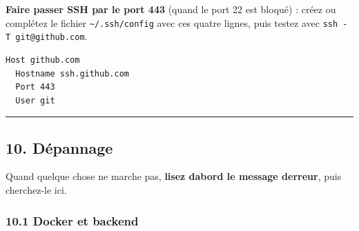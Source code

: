 \documentclass[
  french,
  11pt,
  a4paper,
]{article}
\begin{document}
\textbf{Faire passer SSH par le port 443} (quand le port 22 est bloqué)
: créez ou complétez le fichier \texttt{\textasciitilde{}/.ssh/config}
avec ces quatre lignes, puis testez avec
\texttt{ssh\ -\allowbreak{}T\ git@github.\allowbreak{}com}.

\begin{Verbatim}[breaklines=true,breakanywhere=true,fontsize=\small,frame=leftline,framerule=1.6pt,rulecolor=\color{credixblue},framesep=3mm,xleftmargin=2mm,xrightmargin=1mm]
Host github.com
  Hostname ssh.github.com
  Port 443
  User git
\end{Verbatim}

\begin{center}\rule{0.5\linewidth}{0.5pt}\end{center}

\subsection{10. Dépannage}\label{10-duxe9pannage}

Quand quelque chose ne marche pas, \textbf{lisez d\textquotesingle abord
le message d\textquotesingle erreur}, puis cherchez-le ici.

\subsubsection{10.1 Docker et backend}\label{101-docker-et-backend}
\end{document}
